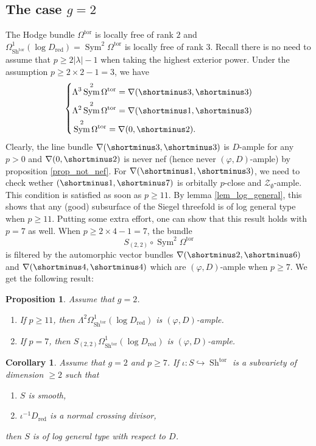 \documentclass[11pt]{amsart}
\numberwithin{subsection}{section}
\numberwithin{figure}{section}
\numberwithin{table}{section}
\theoremstyle{1}
\newtheorem{proposition}[theorem]{Proposition}
\newtheorem{corollary}[theorem]{Corollary}
\theoremstyle{2}
\DeclareMathOperator{\Sh}{Sh}
\DeclareMathOperator{\Sym}{Sym}
\DeclareMathOperator{\tor}{tor}
\DeclareMathOperator{\red}{red}
\begin{document}
\subsection{The case $g = 2$}
The Hodge bundle $\Omega^{\tor}$ is locally free of rank $2$ and $\Omega^1_{\Sh^{\tor}}(\log D_{\red}) = \Sym^2 \Omega^{\tor}$ is locally free of rank $3$. Recall there is no need to assume that $p \geq 2|\lambda |-1$ when taking the highest exterior power. Under the assumption $p \geq 2\times 2 -1 = 3$, we have
\begin{equation*}
\left\{
\begin{aligned}
&\Lambda^{3}\Sym^2 \Omega^{\tor} = \nabla(\shortminus3,\shortminus3) \\
&\Lambda^{2}\Sym^2 \Omega^{\tor} = \nabla(\shortminus1,\shortminus3) \\
&\Sym^2 \Omega^{\tor}  = \nabla(0,\shortminus2).
\end{aligned}
\right.
\end{equation*}
Clearly, the line bundle $\nabla(\shortminus3,\shortminus3)$ is $D$-ample for any $p>0$ and $\nabla(0,\shortminus2)$ is never nef (hence never $(\varphi,D)$-ample) by proposition \ref{prop_not_nef}. For $\nabla(\shortminus1,\shortminus3)$, we need to check wether $(\shortminus1,\shortminus7)$ is orbitally $p$-close and $\mathcal{Z}_{\emptyset}$-ample. This condition is satisfied as soon as $p\geq 11$. By lemma \ref{lem_log_general}, this shows that any (good) subsurface of the Siegel threefold is of log general type when $p\geq 11$. Putting some extra effort, one can show that this result holds with $p = 7$ as well. When $p \geq 2\times 4-1 = 7$, the bundle
\begin{equation*}
S_{(2,2)} \circ \Sym^2 \Omega^{\tor} 
\end{equation*}
is filtered by the automorphic vector bundles $\nabla(\shortminus2,\shortminus6)$ and $\nabla(\shortminus4,\shortminus4)$ which are $(\varphi,D)$-ample when $p \geq 7$. We get the following result:
\begin{proposition}
Assume that $g = 2$. 
\begin{enumerate}
\item If $p\geq 11$, then $\Lambda^{2}\Omega^1_{\Sh^{\tor}}(\log D_{\red})$ is $(\varphi,D)$-ample. 
\item If $p = 7$, then $S_{(2,2)}\Omega^1_{\Sh^{\tor}}(\log D_{\red})$ is $(\varphi,D)$-ample. 
\end{enumerate}
\end{proposition}
\begin{corollary}
Assume that $g = 2$ and $p \geq 7$. If $\iota : S \hookrightarrow \Sh^{\tor}$ is a subvariety of dimension $\geq 2$ such that
\begin{enumerate}
\item $S$ is smooth,
\item $\iota^{-1}D_{\red}$ is a normal crossing divisor,
\end{enumerate}
then $S$ is of log general type with respect to $D$.
\end{corollary}
\end{document}
